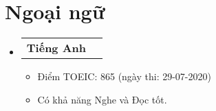 \documentclass[letterpaper,11pt]{article}
\makeatletter
\newcommand{\resumeItem}[1]{
  	\item\small{
    	{#1 \vspace{-2pt}}
  	}
}
\newcommand{\resumeSubheading}[4]{
  	\vspace{-2pt}\item
    \begin{tabular*}{1.0\textwidth}[t]{l@{\extracolsep{\fill}}r}
		\textbf{#1} & \textbf{\small #2} \\
		\textit{\small#3} & \textit{\small #4} \\
    \end{tabular*}\vspace{-7pt}
}
\newcommand{\resumeProjectHeading}[2]{
    \item
    \begin{tabular*}{1.001\textwidth}{l@{\extracolsep{\fill}}r}
      	\small#1 & \textbf{\small #2}\\
    \end{tabular*}\vspace{-7pt}
}
\newcommand{\resumeSubHeadingListStart}{\begin{itemize}[leftmargin=0.0in, label={}]}
\newcommand{\resumeSubHeadingListEnd}{\end{itemize}}
\newcommand{\resumeItemListStart}{\begin{itemize}}
\newcommand{\resumeItemListEnd}{\end{itemize}\vspace{-5pt}}
\makeatother
\begin{document}
%
%
%    

\section{Ngoại ngữ}
    \vspace{-5pt}
    \resumeSubHeadingListStart
      	\resumeProjectHeading
          	{\textbf{Tiếng Anh}}{}
          	\resumeItemListStart
            	\resumeItem{Điểm TOEIC: 865 (ngày thi: 29-07-2020)}
            	\resumeItem{Có khả năng Nghe và Đọc tốt.}
          	\resumeItemListEnd 
    \resumeSubHeadingListEnd
\vspace{-15pt}
\end{document}
